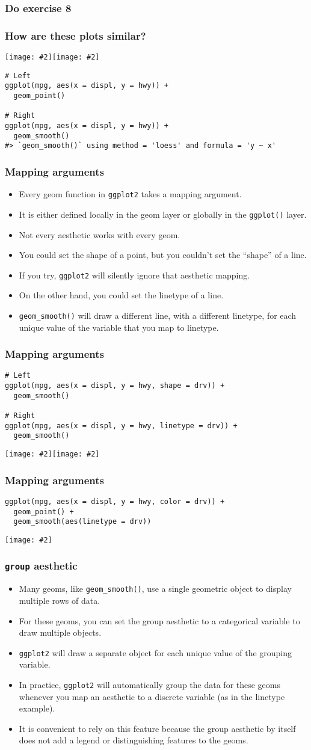 \documentclass{beamer}
\newcommand{\bi}{\begin{itemize}}
\newcommand{\li}{\item}
\newcommand{\ei}{\end{itemize}}
\newcommand{\fig}[2]{\centerline{\texttt{[image: \#2]}}}
\newcommand{\figg}[2]{\texttt{[image: \#2]}}
\newcommand{\bfr}[1]{\begin{frame}[fragile]\frametitle{{ #1 }}}
\begin{document}
\bfr{Do exercise 8}
\end{frame}

\bfr{How are these plots similar?}
\figg{0.5}{unnamed-chunk-9-1.png}\figg{0.5}{unnamed-chunk-9-2.png}
\scriptsize
\begin{verbatim}
# Left
ggplot(mpg, aes(x = displ, y = hwy)) + 
  geom_point()

# Right
ggplot(mpg, aes(x = displ, y = hwy)) + 
  geom_smooth()
#> `geom_smooth()` using method = 'loess' and formula = 'y ~ x'
\end{verbatim}
\end{frame}

\bfr{Mapping arguments}
\bi
\li Every geom function in \verb|ggplot2| takes a mapping argument.
\li It is either defined locally in the geom layer or globally in the \verb|ggplot()| layer.
\li Not every aesthetic works with every geom. 
\li You could set the shape of a point, but you couldn’t set the “shape” of a line. 
\li If you try, \verb|ggplot2| will silently ignore that aesthetic mapping.
\li On the other hand, you could set the linetype of a line. 
\li \verb|geom_smooth()| will draw a different line, with a different linetype, for each unique value of the variable that you map to linetype.
\ei
\end{frame}

\bfr{Mapping arguments}
\begin{verbatim}
# Left
ggplot(mpg, aes(x = displ, y = hwy, shape = drv)) + 
  geom_smooth()

# Right
ggplot(mpg, aes(x = displ, y = hwy, linetype = drv)) + 
  geom_smooth()
\end{verbatim}
\figg{0.5}{unnamed-chunk-11-1.png}\figg{0.5}{unnamed-chunk-11-2.png}
\end{frame}

\bfr{Mapping arguments}\scriptsize
\begin{verbatim}
ggplot(mpg, aes(x = displ, y = hwy, color = drv)) + 
  geom_point() +
  geom_smooth(aes(linetype = drv))
\end{verbatim}
\fig{.8}{unnamed-chunk-12-1.png}

\end{frame}

\bfr{{\tt group} aesthetic}
\bi
\li Many geoms, like \verb|geom_smooth()|, use a single geometric object to display multiple rows of data. 
\li For these geoms, you can set the group aesthetic to a categorical variable to draw multiple objects.
\li \verb|ggplot2| will draw a separate object for each unique value of the grouping variable.
\li In practice, \verb|ggplot2| will automatically group the data for these geoms whenever you map an aesthetic to a discrete variable (as in the linetype example).
\li It is convenient to rely on this feature because the group aesthetic by itself does not add a legend or distinguishing features to the geoms.
\ei
\end{frame}
\end{document}
